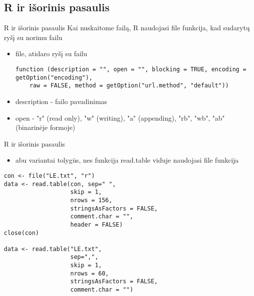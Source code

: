 \documentclass[11pt,xcolor=table]{beamer}
\begin{document}
\subsection{R ir išorinis pasaulis}

\begin{frame}[fragile]{R ir išorinis pasaulis}
Kai nuskaitome failą, R naudojasi file funkcija, kad sudarytų ryšį su norimu failu
\begin{itemize}
\item file, atidaro ryšį su failu
\begin{lstlisting}
function (description = "", open = "", blocking = TRUE, encoding = getOption("encoding"), 
    raw = FALSE, method = getOption("url.method", "default")) 
\end{lstlisting}

\item description - failo pavadinimas
\item open - "r" (read only), "w" (writing), "a" (appending), "rb", "wb", "ab" (binarinėje formoje)
\end{itemize}
\end{frame}

\begin{frame}[fragile]{R ir išorinis pasaulis}
\begin{itemize}
\item abu variantai tolygūs, nes funkcija read.table viduje naudojasi file funkcija
\end{itemize}
\begin{lstlisting}
con <- file("LE.txt", "r")
data <- read.table(con, sep=" ", 
                   skip = 1, 
                   nrows = 156, 
                   stringsAsFactors = FALSE, 
                   comment.char = "", 
                   header = FALSE)
close(con)

data <- read.table("LE.txt", 
                   sep=",", 
                   skip = 1, 
                   nrows = 60, 
                   stringsAsFactors = FALSE, 
                   comment.char = "")
\end{lstlisting}

\end{frame}
\end{document}
